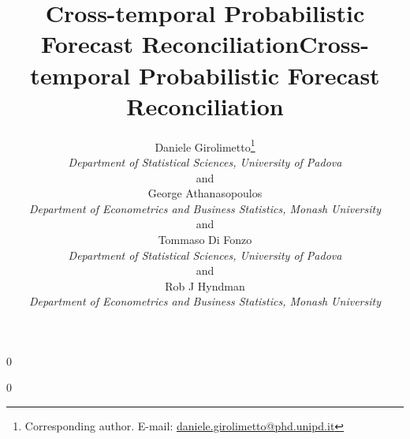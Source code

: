 \documentclass[12pt]{article}
\newcommand{\blind}{0}
\theoremstyle{definition}
\begin{document}
%

\def\spacingset#1{\renewcommand{\baselinestretch}%
{#1}\small\normalsize} \spacingset{1}



\blind
{
  \title{\bf Cross-temporal Probabilistic Forecast Reconciliation}
  \author{Daniele Girolimetto\thanks{Corresponding author. E-mail: \href{mailto:daniele.girolimetto@phd.unipd.it}{daniele.girolimetto@phd.unipd.it}}\\
\textit{Department of Statistical Sciences, University of Padova}\\
\normalsize and\\
 George Athanasopoulos\\
\textit{Department of Econometrics and Business Statistics, Monash University}\\
\normalsize and\\
 Tommaso Di Fonzo\\
\textit{Department of Statistical Sciences, University of Padova}\\
\normalsize and\\
 Rob J Hyndman\\
\textit{Department of Econometrics and Business Statistics, Monash University}}
  \maketitle
  \newpage
} \fi


\blind
{
  \title{\bf Cross-temporal Probabilistic Forecast Reconciliation}
  \maketitle
} \fi
\end{document}
